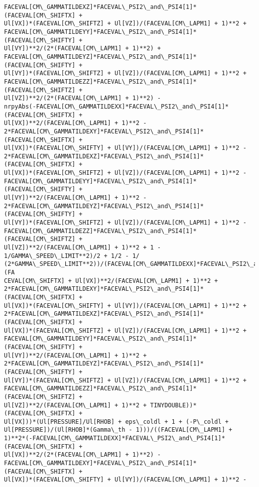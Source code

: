 \documentclass[landscape,letterpaper,10pt,english]{article}
\begin{document}
\begin{Verbatim}[commandchars=\\\{\}]
FACEVAL[CM\_GAMMATILDEXZ]*FACEVAL\_PSI2\_and\_PSI4[1]*(FACEVAL[CM\_SHIFTX] +
Ul[VX])*(FACEVAL[CM\_SHIFTZ] + Ul[VZ])/(FACEVAL[CM\_LAPM1] + 1)**2 +
FACEVAL[CM\_GAMMATILDEYY]*FACEVAL\_PSI2\_and\_PSI4[1]*(FACEVAL[CM\_SHIFTY] +
Ul[VY])**2/(2*(FACEVAL[CM\_LAPM1] + 1)**2) +
FACEVAL[CM\_GAMMATILDEYZ]*FACEVAL\_PSI2\_and\_PSI4[1]*(FACEVAL[CM\_SHIFTY] +
Ul[VY])*(FACEVAL[CM\_SHIFTZ] + Ul[VZ])/(FACEVAL[CM\_LAPM1] + 1)**2 +
FACEVAL[CM\_GAMMATILDEZZ]*FACEVAL\_PSI2\_and\_PSI4[1]*(FACEVAL[CM\_SHIFTZ] +
Ul[VZ])**2/(2*(FACEVAL[CM\_LAPM1] + 1)**2) -
nrpyAbs(-FACEVAL[CM\_GAMMATILDEXX]*FACEVAL\_PSI2\_and\_PSI4[1]*(FACEVAL[CM\_SHIFTX] +
Ul[VX])**2/(FACEVAL[CM\_LAPM1] + 1)**2 -
2*FACEVAL[CM\_GAMMATILDEXY]*FACEVAL\_PSI2\_and\_PSI4[1]*(FACEVAL[CM\_SHIFTX] +
Ul[VX])*(FACEVAL[CM\_SHIFTY] + Ul[VY])/(FACEVAL[CM\_LAPM1] + 1)**2 -
2*FACEVAL[CM\_GAMMATILDEXZ]*FACEVAL\_PSI2\_and\_PSI4[1]*(FACEVAL[CM\_SHIFTX] +
Ul[VX])*(FACEVAL[CM\_SHIFTZ] + Ul[VZ])/(FACEVAL[CM\_LAPM1] + 1)**2 -
FACEVAL[CM\_GAMMATILDEYY]*FACEVAL\_PSI2\_and\_PSI4[1]*(FACEVAL[CM\_SHIFTY] +
Ul[VY])**2/(FACEVAL[CM\_LAPM1] + 1)**2 -
2*FACEVAL[CM\_GAMMATILDEYZ]*FACEVAL\_PSI2\_and\_PSI4[1]*(FACEVAL[CM\_SHIFTY] +
Ul[VY])*(FACEVAL[CM\_SHIFTZ] + Ul[VZ])/(FACEVAL[CM\_LAPM1] + 1)**2 -
FACEVAL[CM\_GAMMATILDEZZ]*FACEVAL\_PSI2\_and\_PSI4[1]*(FACEVAL[CM\_SHIFTZ] +
Ul[VZ])**2/(FACEVAL[CM\_LAPM1] + 1)**2 + 1 - 1/GAMMA\_SPEED\_LIMIT**2)/2 + 1/2 - 1/
(2*GAMMA\_SPEED\_LIMIT**2))/(FACEVAL[CM\_GAMMATILDEXX]*FACEVAL\_PSI2\_and\_PSI4[1]*(FA
CEVAL[CM\_SHIFTX] + Ul[VX])**2/(FACEVAL[CM\_LAPM1] + 1)**2 +
2*FACEVAL[CM\_GAMMATILDEXY]*FACEVAL\_PSI2\_and\_PSI4[1]*(FACEVAL[CM\_SHIFTX] +
Ul[VX])*(FACEVAL[CM\_SHIFTY] + Ul[VY])/(FACEVAL[CM\_LAPM1] + 1)**2 +
2*FACEVAL[CM\_GAMMATILDEXZ]*FACEVAL\_PSI2\_and\_PSI4[1]*(FACEVAL[CM\_SHIFTX] +
Ul[VX])*(FACEVAL[CM\_SHIFTZ] + Ul[VZ])/(FACEVAL[CM\_LAPM1] + 1)**2 +
FACEVAL[CM\_GAMMATILDEYY]*FACEVAL\_PSI2\_and\_PSI4[1]*(FACEVAL[CM\_SHIFTY] +
Ul[VY])**2/(FACEVAL[CM\_LAPM1] + 1)**2 +
2*FACEVAL[CM\_GAMMATILDEYZ]*FACEVAL\_PSI2\_and\_PSI4[1]*(FACEVAL[CM\_SHIFTY] +
Ul[VY])*(FACEVAL[CM\_SHIFTZ] + Ul[VZ])/(FACEVAL[CM\_LAPM1] + 1)**2 +
FACEVAL[CM\_GAMMATILDEZZ]*FACEVAL\_PSI2\_and\_PSI4[1]*(FACEVAL[CM\_SHIFTZ] +
Ul[VZ])**2/(FACEVAL[CM\_LAPM1] + 1)**2 + TINYDOUBLE))*(FACEVAL[CM\_SHIFTX] +
Ul[VX]))*(Ul[PRESSURE]/Ul[RHOB] + eps\_coldl + 1 + (-P\_coldl +
Ul[PRESSURE])/(Ul[RHOB]*(Gamma\_th - 1)))/((FACEVAL[CM\_LAPM1] +
1)**2*(-FACEVAL[CM\_GAMMATILDEXX]*FACEVAL\_PSI2\_and\_PSI4[1]*(FACEVAL[CM\_SHIFTX] +
Ul[VX])**2/(2*(FACEVAL[CM\_LAPM1] + 1)**2) -
FACEVAL[CM\_GAMMATILDEXY]*FACEVAL\_PSI2\_and\_PSI4[1]*(FACEVAL[CM\_SHIFTX] +
Ul[VX])*(FACEVAL[CM\_SHIFTY] + Ul[VY])/(FACEVAL[CM\_LAPM1] + 1)**2 -

\end{Verbatim}
\end{document}
